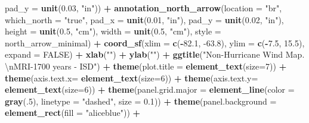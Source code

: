 \documentclass[12pt,twoside]{reedthesis}
\newenvironment{Shaded}{\begin{snugshade}}{\end{snugshade}}
\newcommand{\CharTok}[1]{\textcolor[rgb]{0.31,0.60,0.02}{#1}}
\newcommand{\DataTypeTok}[1]{\textcolor[rgb]{0.13,0.29,0.53}{#1}}
\newcommand{\DecValTok}[1]{\textcolor[rgb]{0.00,0.00,0.81}{#1}}
\newcommand{\FloatTok}[1]{\textcolor[rgb]{0.00,0.00,0.81}{#1}}
\newcommand{\KeywordTok}[1]{\textcolor[rgb]{0.13,0.29,0.53}{\textbf{#1}}}
\newcommand{\NormalTok}[1]{#1}
\newcommand{\OperatorTok}[1]{\textcolor[rgb]{0.81,0.36,0.00}{\textbf{#1}}}
\newcommand{\OtherTok}[1]{\textcolor[rgb]{0.56,0.35,0.01}{#1}}
\newcommand{\StringTok}[1]{\textcolor[rgb]{0.31,0.60,0.02}{#1}}
\begin{document}
\begin{Shaded}
\begin{Highlighting}[]
   \DataTypeTok{pad_y =} \KeywordTok{unit}\NormalTok{(}\FloatTok{0.03}\NormalTok{, }\StringTok{"in"}\NormalTok{)) }\OperatorTok{+}\StringTok{ }
\StringTok{  }\KeywordTok{annotation_north_arrow}\NormalTok{(}\DataTypeTok{location =} \StringTok{"br"}\NormalTok{, }\DataTypeTok{which_north =} \StringTok{"true"}\NormalTok{, }\DataTypeTok{pad_x =} \KeywordTok{unit}\NormalTok{(}\FloatTok{0.01}\NormalTok{, }\StringTok{"in"}\NormalTok{), }\DataTypeTok{pad_y =} \KeywordTok{unit}\NormalTok{(}\FloatTok{0.02}\NormalTok{, }\StringTok{"in"}\NormalTok{), }\DataTypeTok{height =} \KeywordTok{unit}\NormalTok{(}\FloatTok{0.5}\NormalTok{, }\StringTok{"cm"}\NormalTok{),}
   \DataTypeTok{width =} \KeywordTok{unit}\NormalTok{(}\FloatTok{0.5}\NormalTok{, }\StringTok{"cm"}\NormalTok{), }\DataTypeTok{style =}\NormalTok{ north_arrow_minimal) }\OperatorTok{+}
\StringTok{  }\KeywordTok{coord_sf}\NormalTok{(}\DataTypeTok{xlim =} \KeywordTok{c}\NormalTok{(}\OperatorTok{-}\FloatTok{82.1}\NormalTok{, }\FloatTok{-63.8}\NormalTok{), }\DataTypeTok{ylim =} \KeywordTok{c}\NormalTok{(}\OperatorTok{-}\FloatTok{7.5}\NormalTok{, }\FloatTok{15.5}\NormalTok{), }\DataTypeTok{expand =} \OtherTok{FALSE}\NormalTok{) }\OperatorTok{+}
\StringTok{  }\KeywordTok{xlab}\NormalTok{(}\StringTok{""}\NormalTok{) }\OperatorTok{+}\StringTok{ }
\StringTok{  }\KeywordTok{ylab}\NormalTok{(}\StringTok{""}\NormalTok{) }\OperatorTok{+}\StringTok{ }
\StringTok{  }\KeywordTok{ggtitle}\NormalTok{(}\StringTok{"Non-Hurricane Wind Map. }\CharTok{\textbackslash{}n}\StringTok{MRI-1700 years - ISD"}\NormalTok{) }\OperatorTok{+}\StringTok{ }
\StringTok{  }\KeywordTok{theme}\NormalTok{(}\DataTypeTok{plot.title =} \KeywordTok{element_text}\NormalTok{(}\DataTypeTok{size=}\DecValTok{7}\NormalTok{)) }\OperatorTok{+}
\StringTok{  }\KeywordTok{theme}\NormalTok{(}\DataTypeTok{axis.text.x=} \KeywordTok{element_text}\NormalTok{(}\DataTypeTok{size=}\DecValTok{6}\NormalTok{)) }\OperatorTok{+}\StringTok{ }
\StringTok{  }\KeywordTok{theme}\NormalTok{(}\DataTypeTok{axis.text.y=} \KeywordTok{element_text}\NormalTok{(}\DataTypeTok{size=}\DecValTok{6}\NormalTok{)) }\OperatorTok{+}
\StringTok{  }\KeywordTok{theme}\NormalTok{(}\DataTypeTok{panel.grid.major =} \KeywordTok{element_line}\NormalTok{(}\DataTypeTok{color =} \KeywordTok{gray}\NormalTok{(.}\DecValTok{5}\NormalTok{), }\DataTypeTok{linetype =} \StringTok{"dashed"}\NormalTok{, }\DataTypeTok{size =} \FloatTok{0.1}\NormalTok{)) }\OperatorTok{+}
\StringTok{  }\KeywordTok{theme}\NormalTok{(}\DataTypeTok{panel.background =} \KeywordTok{element_rect}\NormalTok{(}\DataTypeTok{fill =} \StringTok{"aliceblue"}\NormalTok{)) }\OperatorTok{+}

\end{Highlighting}
\end{Shaded}
\end{document}
